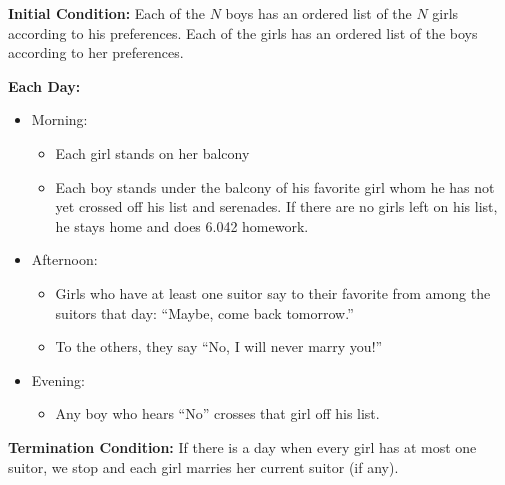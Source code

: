 \documentclass[twoside,12pt]{article}
\begin{document}


\noindent
{\bf Initial Condition:}
Each of the $N$ boys has an ordered list of the $N$
girls according to his preferences.  Each of the girls has an ordered
list of the boys according to her preferences.

\noindent
{\bf Each Day:}

\begin{itemize}
\item Morning:
\begin{itemize}
\item Each girl stands on her balcony
\item Each boy stands under the balcony of his favorite girl
whom he has not yet crossed off his list and serenades.
If there are no girls left on his list, he stays home and does 6.042 homework.
\end{itemize}
\item Afternoon:
\begin{itemize}
\item Girls who have at least one suitor say to their favorite
from among the suitors that day:  ``Maybe, come back tomorrow.''
\item To the others, they say ``No, I will never marry you!''
\end{itemize}
\item Evening:
\begin{itemize}
\item Any boy who hears ``No'' crosses that girl off his list.
\end{itemize}
\end{itemize}

\noindent
{\bf Termination Condition:}
If there is a day when every girl has at most one suitor, we stop
and each girl marries her current suitor (if any).
\end{document}
